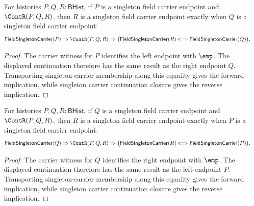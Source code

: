 \begin{theorem}
\label{thm:field-singleton-carrier-continuation-right-endpoint-iff}
For histories $P,Q,R:\mathsf{BHist}$, if $P$ is a singleton field carrier
endpoint and $\ContR(P,Q,R)$, then $R$ is a singleton field carrier endpoint
exactly when $Q$ is a singleton field carrier endpoint:
$$
\mathsf{FieldSingletonCarrier}(P)\Rightarrow
\ContR(P,Q,R)\Rightarrow
\bigl(\mathsf{FieldSingletonCarrier}(R)\Longleftrightarrow
\mathsf{FieldSingletonCarrier}(Q)\bigr).
$$
\end{theorem}
\begin{proof}
The carrier witness for $P$ identifies the left endpoint with $\emp$. The
displayed continuation therefore has the same result as the right endpoint
$Q$. Transporting singleton-carrier membership along this equality gives the
forward implication, while singleton carrier continuation closure gives the
reverse implication.
\end{proof}

\begin{theorem}
\label{thm:field-singleton-carrier-continuation-left-endpoint-iff}
For histories $P,Q,R:\mathsf{BHist}$, if $Q$ is a singleton field carrier
endpoint and $\ContR(P,Q,R)$, then $R$ is a singleton field carrier endpoint
exactly when $P$ is a singleton field carrier endpoint:
$$
\mathsf{FieldSingletonCarrier}(Q)\Rightarrow
\ContR(P,Q,R)\Rightarrow
\bigl(\mathsf{FieldSingletonCarrier}(R)\Longleftrightarrow
\mathsf{FieldSingletonCarrier}(P)\bigr).
$$
\end{theorem}
\begin{proof}
The carrier witness for $Q$ identifies the right endpoint with $\emp$. The
displayed continuation therefore has the same result as the left endpoint
$P$. Transporting singleton-carrier membership along this equality gives the
forward implication, while singleton carrier continuation closure gives the
reverse implication.
\end{proof}

